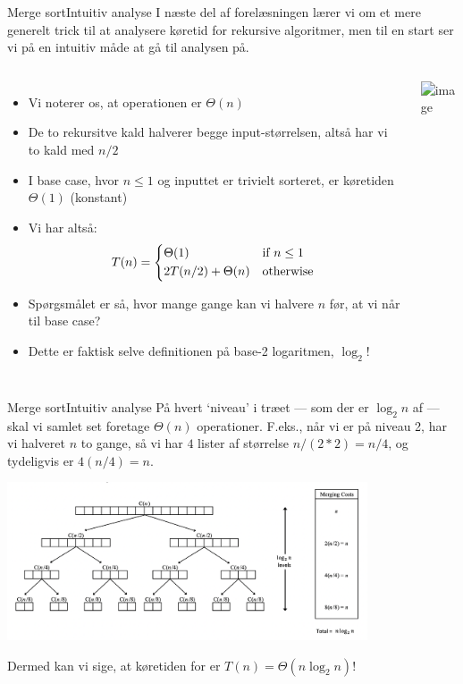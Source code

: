 \documentclass[aspectratio=1610]{beamer}
\begin{document}
\begin{frame}{Merge sort}{Intuitiv analyse}
    I næste del af forelæsningen lærer vi om et mere generelt trick til at
    analysere køretid for rekursive algoritmer, men til en start ser vi på en
    intuitiv måde at gå til analysen på.
    \begin{columns}

        \small

        \pause
        \begin{itemize}[<+->]
            \small
            \item Vi noterer os, at  operationen er $\Theta(n)$
            \item De to rekursitve kald halverer begge input-størrelsen, altså
                har vi to kald med $n/2$
            \item I base case, hvor $n\leq1$ og inputtet er trivielt sorteret,
                er køretiden $\Theta(1)$ (konstant)
            \item Vi har altså: 
                \[ T(n) = \begin{cases*}
                    \Theta(1) & if $n \leq 1$ \\
                    2T(n/2) + \Theta(n) & otherwise
                \end{cases*}
                \]
            \item Spørgsmålet er så, hvor mange gange kan vi halvere $n$ før,
                at vi når til base case?
            \item Dette er faktisk selve definitionen på base-2 logaritmen,
                $\log_2$!
        \end{itemize}
    
        \centerline{\includegraphics<7>[width=.9\textwidth]{recursion-tree}}

    \end{columns}
\end{frame}

\begin{frame}{Merge sort}{Intuitiv analyse}
    På hvert `niveau' i træet --- som der er $\log_2 n$ af --- skal vi samlet set
    foretage $\Theta(n)$ operationer. F.eks., når vi er på niveau 2, har vi
    halveret $n$ to gange, så vi har $4$ lister af størrelse $n/(2*2) =
    n/4$, og tydeligvis er $4(n/4) = n$.

    \centerline{%
        \includegraphics[width=0.8\textwidth]{mergesort-analysis-by-recursion-tree}
    }
    
    \pause
    Dermed kan vi sige, at køretiden for  er $T(n) = \Theta(n
    \log_2 n)$!
\end{frame}
\end{document}
